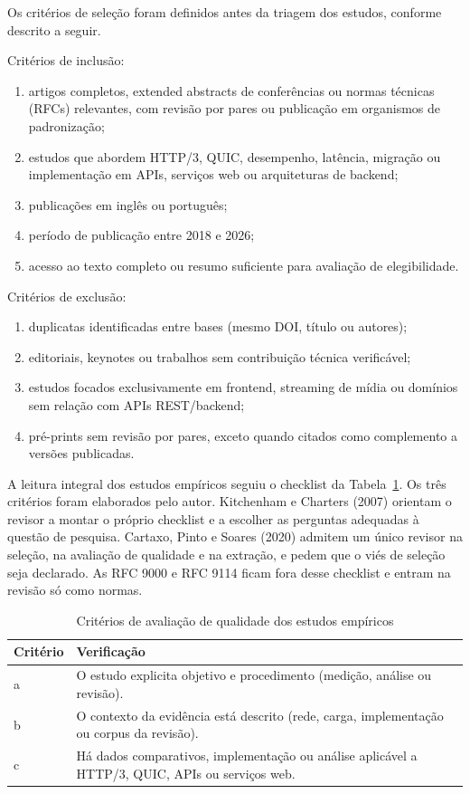 Os critérios de seleção foram definidos antes da triagem dos estudos, conforme descrito a seguir.

Critérios de inclusão:
\begin{enumerate}[label=\alph*)]
\item artigos completos, extended abstracts de conferências ou normas técnicas (RFCs) relevantes, com revisão por pares ou publicação em organismos de padronização;
\item estudos que abordem HTTP/3, QUIC, desempenho, latência, migração ou implementação em APIs, serviços web ou arquiteturas de backend;
\item publicações em inglês ou português;
\item período de publicação entre 2018 e 2026;
\item acesso ao texto completo ou resumo suficiente para avaliação de elegibilidade.
\end{enumerate}

Critérios de exclusão:
\begin{enumerate}[label=\alph*)]
\item duplicatas identificadas entre bases (mesmo DOI, título ou autores);
\item editoriais, keynotes ou trabalhos sem contribuição técnica verificável;
\item estudos focados exclusivamente em frontend, streaming de mídia ou domínios sem relação com APIs REST/backend;
\item pré-prints sem revisão por pares, exceto quando citados como complemento a versões publicadas.
\end{enumerate}

A leitura integral dos estudos empíricos seguiu o checklist da Tabela~\ref{tab:criterios-qualidade}. Os três critérios foram elaborados pelo autor. Kitchenham e Charters (2007) orientam o revisor a montar o próprio checklist e a escolher as perguntas adequadas à questão de pesquisa. Cartaxo, Pinto e Soares (2020) admitem um único revisor na seleção, na avaliação de qualidade e na extração, e pedem que o viés de seleção seja declarado. As RFC 9000 e RFC 9114 ficam fora desse checklist e entram na revisão só como normas.

\begin{table}[htbp]
\centering
\caption{Critérios de avaliação de qualidade dos estudos empíricos}\label{tab:criterios-qualidade}
\small
\setlength{\tabcolsep}{3pt}
\begin{tabular}{@{}>{\raggedright\arraybackslash}p{18mm}>{\raggedright\arraybackslash}p{126mm}@{}}
\hline
\textbf{Critério} & \textbf{Verificação} \\
\hline
a & O estudo explicita objetivo e procedimento (medição, análise ou revisão). \\
b & O contexto da evidência está descrito (rede, carga, implementação ou corpus da revisão). \\
c & Há dados comparativos, implementação ou análise aplicável a HTTP/3, QUIC, APIs ou serviços web. \\
\hline
\end{tabular}
\end{table}

